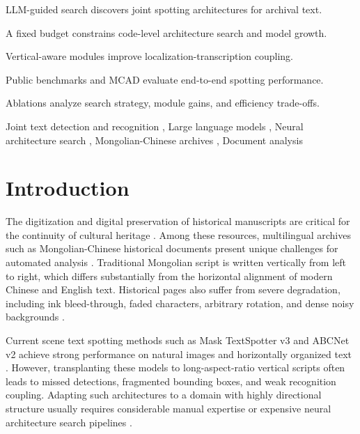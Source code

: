 \documentclass[a4paper,fleqn,longmktitle]{cas-sc}
\begin{document}
\begin{highlights}
\item LLM-guided search discovers joint spotting architectures for archival text.
\item A fixed budget constrains code-level architecture search and model growth.
\item Vertical-aware modules improve localization-transcription coupling.
\item Public benchmarks and MCAD evaluate end-to-end spotting performance.
\item Ablations analyze search strategy, module gains, and efficiency trade-offs.
\end{highlights}

\begin{keywords}
Joint text detection and recognition \sep
Large language models \sep
Neural architecture search \sep
Mongolian-Chinese archives \sep
Document analysis
\end{keywords}

\maketitle

\section{Introduction}

The digitization and digital preservation of historical manuscripts are critical for the continuity of cultural heritage \cite{alberti2016labeled,zhong2019publaynet,antonacopoulos2009page,chen2021mmocr}. Among these resources, multilingual archives such as Mongolian-Chinese historical documents present unique challenges for automated analysis \cite{zhang2017mongolian,wei2019traditional}. Traditional Mongolian script is written vertically from left to right, which differs substantially from the horizontal alignment of modern Chinese and English text. Historical pages also suffer from severe degradation, including ink bleed-through, faded characters, arbitrary rotation, and dense noisy backgrounds \cite{gatos2006adaptive,tensmeyer2017document,le2019using}.

Current scene text spotting methods such as Mask TextSpotter v3 and ABCNet v2 achieve strong performance on natural images and horizontally organized text \cite{liao2020mask,liu2021abcnet,baek2019character,wang2019shape,zhu2021fourier,liu2018fots}. However, transplanting these models to long-aspect-ratio vertical scripts often leads to missed detections, fragmented bounding boxes, and weak recognition coupling. Adapting such architectures to a domain with highly directional structure usually requires considerable manual expertise or expensive neural architecture search pipelines \cite{zoph2017neural,ghiasi2019nas,liu2019autodeeplab,lyu2021autotext}.
\end{document}

